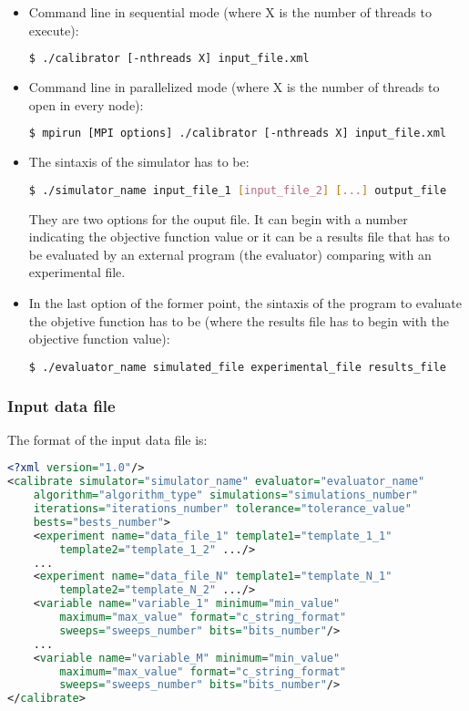 \documentclass[review,authoryear]{elsarticle}
\begin{document}
\begin{itemize}

\item Command line in sequential mode (where X is the number of threads to
execute):
\begin{lstlisting}[language=bash,basicstyle=\scriptsize]
$ ./calibrator [-nthreads X] input_file.xml
\end{lstlisting}

\item Command line in parallelized mode (where X is the number of threads to
open in every node):
\begin{lstlisting}[language=bash,basicstyle=\scriptsize]
$ mpirun [MPI options] ./calibrator [-nthreads X] input_file.xml
\end{lstlisting}

\item The sintaxis of the simulator has to be:
\begin{lstlisting}[language=bash,basicstyle=\scriptsize]
$ ./simulator_name input_file_1 [input_file_2] [...] output_file
\end{lstlisting}
They are two options for the ouput file. It can begin with a number indicating
the objective function value or it can be a results file that has to be
evaluated by an external program (the evaluator) comparing with an experimental
file.

\item In the last option of the former point, the sintaxis of the program to
evaluate the objetive function has to be (where the results file has to begin
with the objective function value):
\begin{lstlisting}[language=bash,basicstyle=\scriptsize]
$ ./evaluator_name simulated_file experimental_file results_file
\end{lstlisting}

\end{itemize}

\subsubsection{Input data file}

The format of the input data file is:
\begin{lstlisting}[language=xml,basicstyle=\scriptsize]
<?xml version="1.0"/>
<calibrate simulator="simulator_name" evaluator="evaluator_name"
	algorithm="algorithm_type" simulations="simulations_number"
	iterations="iterations_number" tolerance="tolerance_value"
	bests="bests_number">
	<experiment name="data_file_1" template1="template_1_1"
		template2="template_1_2" .../>
	...
	<experiment name="data_file_N" template1="template_N_1"
		template2="template_N_2" .../>
	<variable name="variable_1" minimum="min_value"
		maximum="max_value" format="c_string_format"
		sweeps="sweeps_number" bits="bits_number"/>
	...
	<variable name="variable_M" minimum="min_value"
		maximum="max_value" format="c_string_format"
		sweeps="sweeps_number" bits="bits_number"/>
</calibrate>
\end{lstlisting}
\end{document}
